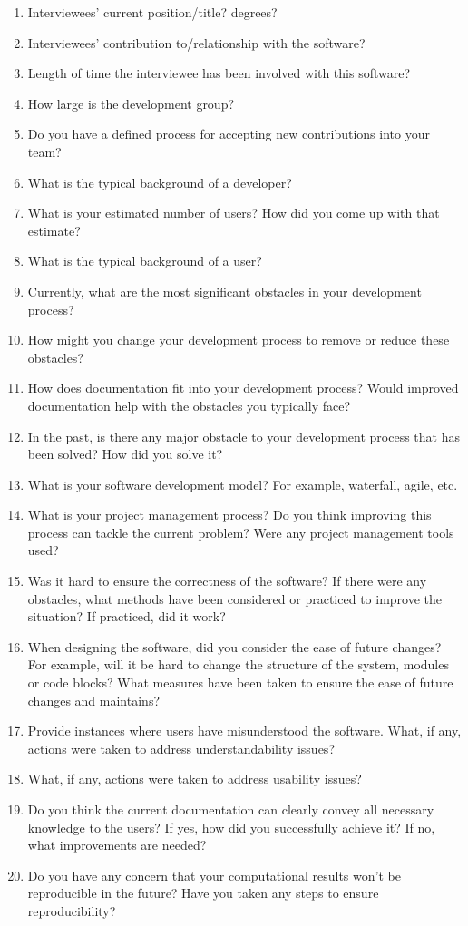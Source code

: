 \documentclass[12pt, notitlepage]{article}
\begin{document}
\begin{singlespace}
\begin{enumerate}
	\item Interviewees’ current position/title? degrees?
	\item Interviewees’ contribution to/relationship with the software?
	\item Length of time the interviewee has been involved with this software?
	\item How large is the development group?
	\item Do you have a defined process for accepting new contributions into your team?
	\item What is the typical background of a developer?
	\item What is your estimated number of users? How did you come up with that estimate?
	\item What is the typical background of a user?
	\item Currently, what are the most significant obstacles in your development process?
	\item How might you change your development process to remove or reduce these obstacles?
	\item How does documentation fit into your development process? Would improved documentation help with the obstacles you typically face?
	\item In the past, is there any major obstacle to your development process that has been solved? How did you solve it?
	\item What is your software development model? For example, waterfall, agile, etc.
	\item What is your project management process? Do you think improving this process can
	tackle the current problem? Were any project management tools used?
	\item Was it hard to ensure the correctness of the software? If there were any obstacles, what methods have been considered or practiced to improve the situation? If practiced, did it work?
	\item When designing the software, did you consider the ease of future changes? For example, will it be hard to change the structure of the system, modules or code blocks? What measures have been taken to ensure the ease of future changes and maintains?
	\item Provide instances where users have misunderstood the software. What, if any, actions were taken to address understandability issues?
	\item What, if any, actions were taken to address usability issues?
	\item Do you think the current documentation can clearly convey all necessary knowledge to the users? If yes, how did you successfully achieve it? If no, what improvements are needed?
	\item Do you have any concern that your computational results won’t be reproducible in the future? Have you taken any steps to ensure reproducibility? 
	

\end{enumerate}
\end{singlespace}
\end{document}
